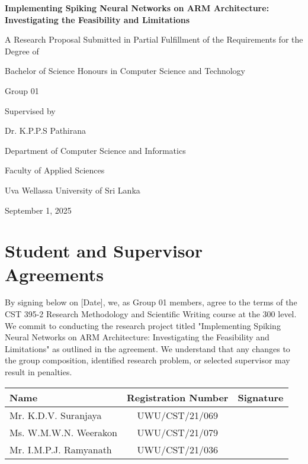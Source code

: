 \documentclass[a4paper,12pt]{article}
\begin{document}
	
	\begin{titlepage}
		\centering
		\vspace*{1cm}
		{\Large\bfseries Implementing Spiking Neural Networks on ARM Architecture: Investigating the Feasibility and Limitations \par}
		\vspace{1cm}
		{\normalsize A Research Proposal Submitted in Partial Fulfillment of the Requirements for the Degree of \par}
		{\normalsize Bachelor of Science Honours in Computer Science and Technology \par}
		\vspace{0.5cm}
		{\normalsize Group 01 \par}
		\vspace{0.5cm}
		{\normalsize Supervised by \par}
		{\normalsize Dr. K.P.P.S Pathirana \par}
		\vspace{0.5cm}
		{\normalsize Department of Computer Science and Informatics \par}
		{\normalsize Faculty of Applied Sciences \par}
		{\normalsize Uva Wellassa University of Sri Lanka \par}
		\vspace{0.5cm}
		{\normalsize September 1, 2025 \par}
	\end{titlepage}
	
	\section*{Student and Supervisor Agreements}
	{\normalsize By signing below on [Date], we, as Group 01 members, agree to the terms of the CST 395-2 Research Methodology and Scientific Writing course at the 300 level. We commit to conducting the research project titled "Implementing Spiking Neural Networks on ARM Architecture: Investigating the Feasibility and Limitations" as outlined in the agreement. We understand that any changes to the group composition, identified research problem, or selected supervisor may result in penalties. \par}
	\vspace{0.5cm}
	\begin{center}
	\begin{tabular}{|l|c|c|}
		\hline
		\textbf{Name} & \textbf{Registration Number} & \textbf{Signature} \\
		\hline
		Mr. K.D.V. Suranjaya  & UWU/CST/21/069  & \\
		\hline
		Ms. W.M.W.N. Weerakon  & UWU/CST/21/079  & \\
		\hline
		Mr. I.M.P.J. Ramyanath & UWU/CST/21/036 & \\
		\hline
	\end{tabular}
	\end{center}
\end{document}
